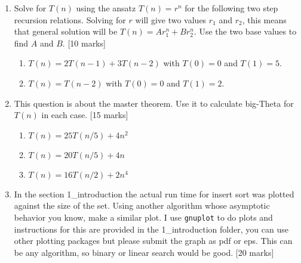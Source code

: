 \documentclass[11pt,a4paper]{scrartcl}
\begin{document}
\begin{enumerate}
\begin{enumerate}
\end{enumerate}

\item Solve for $T(n)$ using the ansatz $T(n)=r^n$ for the following
  two step recursion relations. Solving for $r$ will give two values
  $r_1$ and $r_2$, this means that general solution will be
  $T(n)=Ar_1^n+Br_2^n$. Use the two base values to find $A$ and $B$.  [10 marks]

\begin{enumerate}
\item $T(n)=2T(n-1)+3T(n-2)$ with $T(0)=0$ and $T(1)=5$.
\item $T(n)=T(n-2)$ with $T(0)=0$ and $T(1)=2$.
\end{enumerate}

\item This question is about the master theorem. Use it to
  calculate big-Theta for $T(n)$ in each case.  [15 marks] 

\begin{enumerate}
\item $T(n)= 25T(n/5)+4n^2$
\item $T(n)= 20T(n/5)+4n$
\item $T(n)= 16T(n/2)+2n^4$
\end{enumerate}

\item In the section 1\_introduction the actual run time for insert
  sort was plotted against the size of the set. Using another
  algorithm whose asymptotic behavior you know, make a similar plot. I
  use \texttt{gnuplot} to do plots and instructions for this are
  provided in the 1\_introduction folder, you can use other plotting
  packages but please submit the graph as pdf or eps. This can be any
  algorithm, so binary or linear search would be good. [20 marks]

\end{enumerate}
\end{document}

